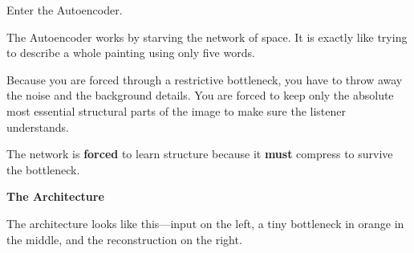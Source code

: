 \documentclass[11pt]{article}
\begin{document}
Enter the Autoencoder.

\vspace{0.2in}

The Autoencoder works by starving the network of space. It is exactly like trying to describe a whole painting using only five words.

\vspace{0.2in}

Because you are forced through a restrictive bottleneck, you have to throw away the noise and the background details. You are forced to keep only the absolute most essential structural parts of the image to make sure the listener understands.

\vspace{0.4in}

\begin{tcolorbox}[
    colback=brandlight,
    colframe=brandorange,
    arc=5pt,
    boxrule=0.8pt,
    left=15pt, right=15pt, top=15pt, bottom=15pt
]
\Large\color{brandnavy}
The network is \textbf{forced} to learn structure because it \textbf{must} compress to survive the bottleneck.
\end{tcolorbox}

\newpage


\vspace*{1.0in}

\begin{center}
{\fontsize{26}{30}\selectfont\color{brandnavy}\bfseries The Architecture}
\end{center}

\vspace{0.2in}

The architecture looks like this—input on the left, a tiny bottleneck in orange in the middle, and the reconstruction on the right.

\vspace{0.4in}

\end{document}
